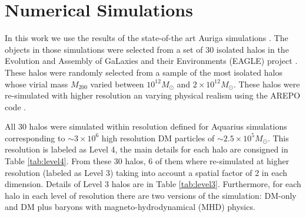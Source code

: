 \documentclass[a4paper,fleqn,usenatbib]{mnras}
\begin{document}
\section{Numerical Simulations}

In this work we use the results of the state-of-the art Auriga
simulations \citep{auriga}. 
The objects in those simulations were selected from a set of 30
isolated halos in the Evolution and Assembly of GaLaxies and their
Environments (EAGLE)  project \citep{Eagle}.   
These halos were randomly selected from a sample of the most isolated
halos whose virial mass $M_{200}$ varied between $10^{12}M_\odot$ and
$2\times 10^{12}M_\odot$. 
These halos were re-simulated with higher resolution an varying
physical realism using the AREPO code \citep{arepo}.
 
All 30 halos were simulated within resolution defined for Aquarius
simulations corresponding to $\sim 3\times 10^6$ high resolution DM
particles of $\sim 2.5 \times 10^5 M_\odot$.  
This resolution is labeled as Level 4, the main details for each halo
are consigned in Table \ref{tab:level4}. 
From these 30 halos, 6 of them where re-simulated at higher resolution
(labeled as Level 3) taking into account a spatial factor of 2 in each
dimension.   
Details of Level 3 halos are in Table \ref{tab:level3}. 
Furthermore, for each halo in each level of resolution there are two
versions of the simulation: DM-only and DM plus baryons with
magneto-hydrodynamical (MHD) physics.  
\end{document}
